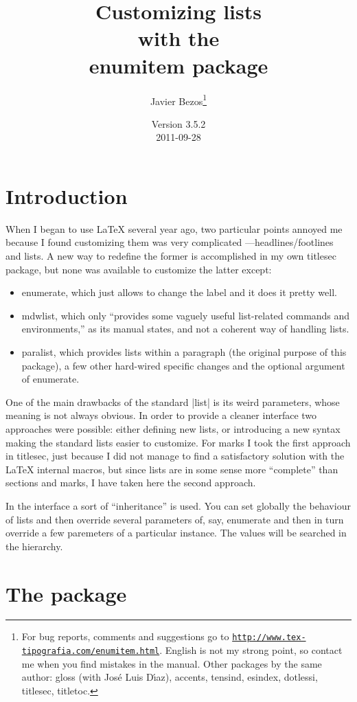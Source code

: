 \documentclass[a4paper]{ltxguide}
\title{Customizing lists\\with the\\\textsf{enumitem} package}
\author{Javier Bezos\footnote{For bug reports, comments and
suggestions go to \href{http://www.tex-tipografia.com/enumitem.html}%
{\texttt{http://www.tex-tipografia.com/enumitem.html}}.
English is not my strong point, so contact me when you
find mistakes in the manual. Other packages by the same author:
\textsf{gloss} (with Jos\'e Luis D\'{\i}az), \textsf{accents,
tensind, esindex, dotlessi, titlesec, titletoc}.}}
\date{Version 3.5.2\\2011-09-28}
\newcommand\3{\unskip\enspace\fbox{\fontsize{4}{4}\selectfont NEW 3.0}}
\begin{document}
\maketitle
\tableofcontents

\section{Introduction}

When I began to use \LaTeX{} several year ago, two particular points
annoyed me because I found customizing them was very complicated
---headlines/footlines and lists.  A new way to redefine the former is
accomplished in my own \textsf{titlesec} package, but none was
available to customize the latter except:
\begin{itemize}
\item \textsf{enumerate}, which just allows to change the label and
it does it pretty well.

\item \textsf{mdwlist}, which only ``provides some vaguely useful
list-related commands and environments,'' as its manual states,
and not a coherent way of handling lists.

\item \textsf{paralist}, which provides lists within a paragraph (the
original purpose of this package), a few other hard-wired
specific changes and the optional argument of \textsf{enumerate}.
\end{itemize}

One of the main drawbacks of the standard |list| is its weird
parameters, whose meaning is not always obvious.  In order to provide
a cleaner interface two approaches were possible: either defining new
lists, or introducing a new syntax making the standard lists easier to
customize.  For marks I took the first approach in titlesec, just
because I did not manage to find a satisfactory solution with the
\LaTeX{} internal macros, but since lists are in some sense more
``complete'' than sections and marks, I have taken here the second
approach.

In the interface a sort of ``inheritance'' is used. You can
set globally the behaviour of lists and then override several
parameters of, say, enumerate and then in turn override
a few paremeters of a particular instance. The values will
be searched in the hierarchy.

\section{The package}
\end{document}
